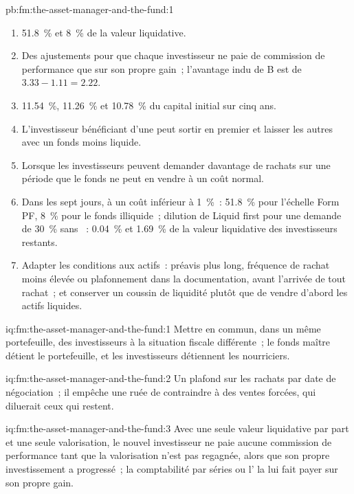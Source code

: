 \begin{solution}{pb:fm:the-asset-manager-and-the-fund:1}
\begin{enumerate}
\item 51.8~\% et 8~\% de la valeur liquidative.
\item Des ajustements pour que chaque investisseur ne paie de commission de performance que sur son propre gain~; l'avantage indu de B est de $3.33-1.11=2.22$.
\item 11.54~\%, 11.26~\% et 10.78~\% du capital initial sur cinq ans.
\item L'investisseur bénéficiant d'une  peut sortir en premier et laisser les autres avec un fonds moins liquide.
\item Lorsque les investisseurs peuvent demander davantage de rachats sur une période que le fonds ne peut en vendre à un coût normal.
\item Dans les sept jours, à un coût inférieur à 1~\%~: 51.8~\% pour l'échelle Form PF, 8~\% pour le fonds illiquide~; dilution de Liquid first pour une demande de 30~\%
sans ~: 0.04~\% et 1.69~\% de la valeur liquidative des investisseurs restants.
\item Adapter les conditions aux actifs~: préavis plus long, fréquence de rachat moins élevée ou plafonnement dans la documentation, avant l'arrivée de tout rachat~; et conserver un
coussin de liquidité plutôt que de vendre d'abord les actifs liquides.
\end{enumerate}
\end{solution}

\begin{solution}{iq:fm:the-asset-manager-and-the-fund:1}
Mettre en commun, dans un même portefeuille, des investisseurs à la situation fiscale différente~; le fonds maître détient le portefeuille, et les investisseurs détiennent les nourriciers.
\end{solution}

\begin{solution}{iq:fm:the-asset-manager-and-the-fund:2}
Un plafond sur les rachats par date de négociation~; il empêche une ruée de contraindre à des ventes forcées, qui diluerait ceux qui restent.
\end{solution}

\begin{solution}{iq:fm:the-asset-manager-and-the-fund:3}
Avec une seule valeur liquidative par part et une seule valorisation, le nouvel investisseur ne paie aucune commission de performance tant que la valorisation n'est pas regagnée, alors que son propre investissement a progressé~;
la comptabilité par séries ou l' la lui fait payer sur son propre gain.
\end{solution}

